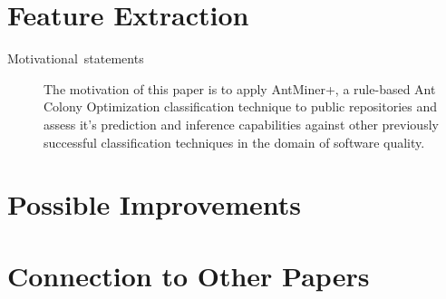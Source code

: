 \documentclass[english]{article}
\begin{document}
\section*{Feature Extraction}
\begin{description}
\item [{Motivational~statements}] The motivation of this paper is to apply AntMiner+, a rule-based Ant Colony Optimization classification technique to public repositories and assess it's prediction and inference capabilities against other previously successful classification techniques in the domain of software quality.
\end{description}



\section*{Possible Improvements}


\section*{Connection to Other Papers}





\end{document}
